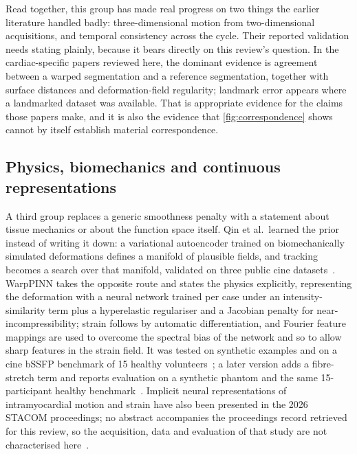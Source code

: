 Read together, this group has made real progress on two things the earlier literature handled badly:
three-dimensional motion from two-dimensional acquisitions, and temporal consistency across the
cycle. Their reported validation needs stating plainly, because it bears
directly on this review's question. In the cardiac-specific papers reviewed here, the dominant
evidence is agreement between a warped segmentation and a reference segmentation, together with
surface distances and deformation-field regularity; landmark error appears where a landmarked
dataset was available. That is appropriate evidence for the claims those papers make, and it is also
the evidence that \cref{fig:correspondence} shows cannot by itself establish material
correspondence.

\subsection{Physics, biomechanics and continuous representations}\label{sec:physics}

A third group replaces a generic smoothness penalty with a statement about tissue mechanics or about
the function space itself. Qin et al.\ learned the prior instead of writing it down: a variational
autoencoder trained on biomechanically simulated deformations defines a manifold of plausible
fields, and tracking becomes a search over that manifold, validated on three public cine
datasets~\citep{qin2023biomech}. WarpPINN takes the opposite route and states the physics
explicitly, representing the deformation with a neural network trained per case under an
intensity-similarity term plus a hyperelastic regulariser and a Jacobian penalty for
near-incompressibility; strain follows by automatic differentiation, and Fourier feature mappings
are used to overcome the spectral bias of the network and so to allow sharp features in the strain
field. It was tested on synthetic examples and on a cine bSSFP benchmark of 15 healthy
volunteers~\citep{arratia2023warppinn}; a later version adds a fibre-stretch term and reports
evaluation on a synthetic phantom and the same 15-participant healthy
benchmark~\citep{alvarez2026warppinn}. Implicit neural representations of intramyocardial motion and strain
have also been presented in the 2026 STACOM proceedings; no abstract accompanies the proceedings
record retrieved for this review, so the acquisition, data and evaluation of that study are not
characterised here~\citep{bell2026inr}.

